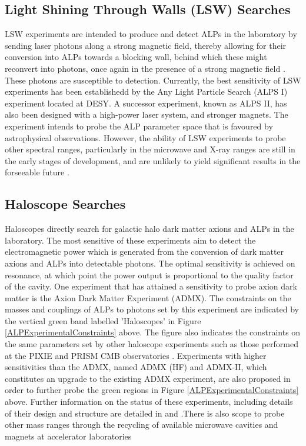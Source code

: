 \subsection{Light Shining Through Walls (LSW) Searches}
LSW experiments are intended to produce and detect ALPs in the laboratory by sending laser photons along a strong magnetic field,
thereby allowing for their conversion into ALPs towards a blocking wall, behind which these might reconvert into photons, once again in the presence of 
a strong magnetic field \cite{https://doi.org/10.48550/arxiv.1407.0546}. These photons are susceptible to detection. Currently, the best sensitivity of LSW experiments has been establishedd by the Any Light Particle Search
(ALPS I) experiment located at DESY. A successor experiment, known as ALPS II, has also been designed with a high-power laser system, and stronger magnets. The experiment intends to 
probe the ALP parameter space that is favoured by astrophysical observations. However, the ability of LSW experiments to probe other spectral ranges, particularly in the microwave and
X-ray ranges are still in the early stages of development, and are unlikely to yield significant results in the forseeable future \cite{https://doi.org/10.48550/arxiv.1407.0546}.
\subsection{Haloscope Searches}
Haloscopes directly search for galactic halo dark matter axions and ALPs in the laboratory. The most sensitive of these experiments aim to detect the electromagnetic power which is generated from the conversion of dark matter axions and ALPs into detectable photons.
The optimal sensitivity is achieved on resonance, at which point the power output is proportional to the quality factor of the cavity. One experiment that has attained a sensitivity to probe axion dark matter is the Axion Dark Matter Experiment (ADMX). The constraints on the masses
and couplings of ALPs to photons set by this
experiment are indicated by the vertical green band labelled 'Haloscopes' in Figure \ref{ALPExperimentalConstraints} above. The figure also indicates the constraints on the same parameters set by other haloscope experiments such as those performed at the PIXIE and PRISM CMB observatories \cite{https://doi.org/10.48550/arxiv.1407.0546}. Experiments with
higher sensitivities than the ADMX, named ADMX (HF) and ADMX-II, which constitutes an upgrade to the existing ADMX experiment, are also proposed in order to further probe the green regions in Figure \ref{ALPExperimentalConstraints} above. Further information on the status of these experiments, including details of their design and structure are detailed in \cite{ADMX:2020ote} and \cite{Nitta:2022jez}.There is also scope to probe other mass ranges through the recycling of available microwave cavities and magnets at accelerator laboratories \cite{https://doi.org/10.48550/arxiv.1407.0546}
